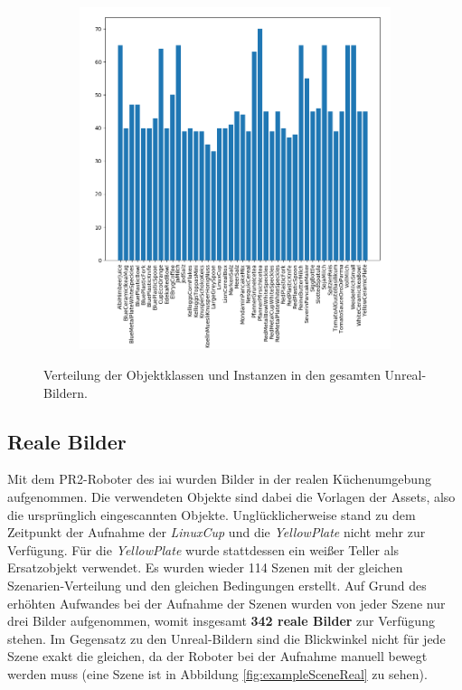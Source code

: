 \begin{figure}
\begin{subfigure}[b]{0.58\textwidth}
		\includegraphics[scale=.4]{img/chapter6/UnrealGTInstance_analysis.png}	
	\end{subfigure}
\caption[Verteilung der Objekte in den Unreal-Bildern]{Verteilung der Objektklassen und Instanzen in den gesamten Unreal-Bildern.}
\label{fig:Unreal-Images_analysis}
\end{figure}

\subsection{Reale Bilder}
Mit dem PR2-Roboter des \gls{iai} wurden Bilder in der realen Küchenumgebung aufgenommen. Die verwendeten Objekte sind dabei die Vorlagen der Assets, also die ursprünglich eingescannten Objekte. Unglücklicherweise stand zu dem Zeitpunkt der Aufnahme der \textit{LinuxCup} und die \textit{YellowPlate} nicht mehr zur Verfügung. Für die \textit{YellowPlate} wurde stattdessen ein weißer Teller als Ersatzobjekt verwendet. Es wurden wieder 114 Szenen mit der gleichen Szenarien-Verteilung und den gleichen Bedingungen erstellt. Auf Grund des erhöhten Aufwandes bei der Aufnahme der Szenen wurden von jeder Szene nur drei Bilder aufgenommen, womit insgesamt \textbf{342 reale Bilder} zur Verfügung stehen. Im Gegensatz zu den Unreal-Bildern sind die Blickwinkel nicht für jede Szene exakt die gleichen, da der Roboter bei der Aufnahme manuell bewegt werden muss (eine Szene ist in Abbildung \ref{fig:exampleSceneReal} zu sehen). \par

